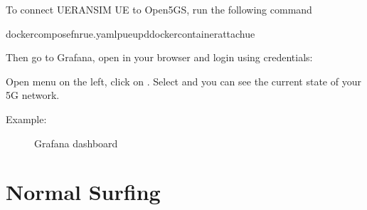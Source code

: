 \documentclass[letterpaper,10pt,english]{sphinxmanual}
\begin{document}
\sphinxAtStartPar
To connect UERANSIM UE to Open5GS, run the following command

\begin{sphinxVerbatim}[commandchars=\\\{\}]
dockercompose\PYGZhy{}fnr\PYGZhy{}ue.yaml\PYGZhy{}pueup\PYGZhy{}ddockercontainerattachue
\end{sphinxVerbatim}

\sphinxAtStartPar
Then go to Grafana, open  in your browser and login using credentials:

\begin{sphinxVerbatim}[commandchars=\\\{\}]
 
 
\end{sphinxVerbatim}

\sphinxAtStartPar
Open menu on the left, click on . Select  and you can see the current state of your 5G network.

\sphinxAtStartPar
Example:

\begin{figure}[htbp]
\centering
\capstart

\noindent{}
\caption{Grafana dashboard}\label{\detokenize{installation:id1}}\end{figure}

\sphinxstepscope


\chapter{Normal Surfing}
\label{\detokenize{uc1:module-uc1}}\label{\detokenize{uc1:normal-surfing}}\label{\detokenize{uc1::doc}}
\end{document}
